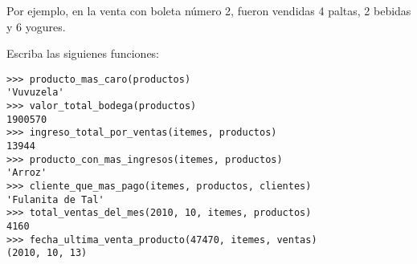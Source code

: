 Por ejemplo, en la venta con boleta número 2, fueron vendidas 4 paltas,
2 bebidas y 6 yogures.

Escriba las siguienes funciones:

\begin{lstlisting}
>>> producto_mas_caro(productos)
'Vuvuzela'
>>> valor_total_bodega(productos)
1900570
>>> ingreso_total_por_ventas(itemes, productos)
13944
>>> producto_con_mas_ingresos(itemes, productos)
'Arroz'
>>> cliente_que_mas_pago(itemes, productos, clientes)
'Fulanita de Tal'
>>> total_ventas_del_mes(2010, 10, itemes, productos)
4160
>>> fecha_ultima_venta_producto(47470, itemes, ventas)
(2010, 10, 13)
\end{lstlisting}

